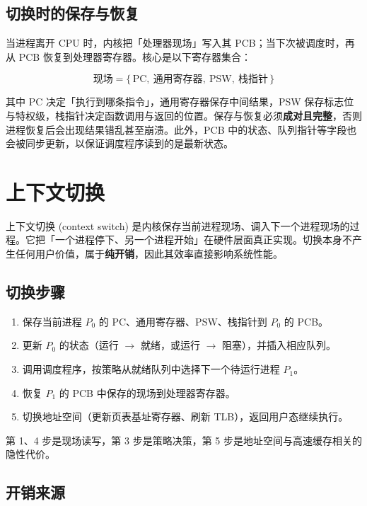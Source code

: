\subsection{切换时的保存与恢复}

\noindent 当进程离开 CPU 时，内核把「处理器现场」写入其 PCB；当下次被调度时，再从 PCB 恢复到处理器寄存器。核心是以下寄存器集合：

\begin{equation}
    \text{现场} = \{\, \text{PC},\ \text{通用寄存器},\ \text{PSW},\ \text{栈指针} \,\}
\end{equation}

\noindent 其中 PC 决定「执行到哪条指令」，通用寄存器保存中间结果，PSW 保存标志位与特权级，栈指针决定函数调用与返回的位置。保存与恢复必须\textbf{成对且完整}，否则进程恢复后会出现结果错乱甚至崩溃。此外，PCB 中的状态、队列指针等字段也会被同步更新，以保证调度程序读到的是最新状态。

\section{上下文切换}

\noindent 上下文切换 (context switch) 是内核保存当前进程现场、调入下一个进程现场的过程。它把「一个进程停下、另一个进程开始」在硬件层面真正实现。切换本身不产生任何用户价值，属于\textbf{纯开销}，因此其效率直接影响系统性能。

\subsection{切换步骤}

\begin{enumerate}
    \item 保存当前进程 $P_0$ 的 PC、通用寄存器、PSW、栈指针到 $P_0$ 的 PCB。
    \item 更新 $P_0$ 的状态（运行 $\to$ 就绪，或运行 $\to$ 阻塞），并插入相应队列。
    \item 调用调度程序，按策略从就绪队列中选择下一个待运行进程 $P_1$。
    \item 恢复 $P_1$ 的 PCB 中保存的现场到处理器寄存器。
    \item 切换地址空间（更新页表基址寄存器、刷新 TLB），返回用户态继续执行。
\end{enumerate}

\noindent 第 1、4 步是现场读写，第 3 步是策略决策，第 5 步是地址空间与高速缓存相关的隐性代价。

\subsection{开销来源}

